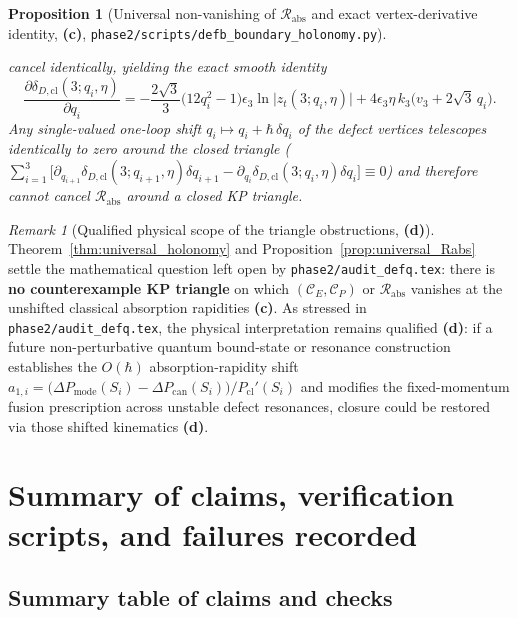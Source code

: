 \documentclass[11pt,a4paper]{article}
\newtheorem{proposition}[theorem]{Proposition}
\theoremstyle{remark}
\newtheorem{remark}[theorem]{Remark}
\newcommand{\hb}{\hbar}
\newcommand{\Lc}{\textbf{(c)}}
\newcommand{\Ld}{\textbf{(d)}}
\newcommand{\shol}{\texttt{phase2/\allowbreak scripts/\allowbreak defb\_\allowbreak boundary\_\allowbreak holonomy.py}}
\begin{document}
\begin{proposition}[Universal non-vanishing of $\mathcal{R}_{\mathrm{abs}}$ and exact vertex-derivative identity, \Lc, \shol]
\begin{enumerate}
cancel identically, yielding the exact smooth identity
\begin{equation}\label{eq:d_delta_dqi_exact}
  \boxed{\;
  \frac{\partial\delta_{D,\mathrm{cl}}(3;q_i,\eta)}{\partial q_i}
  = -\frac{2\sqrt{3}}{3}\big(12q_i^2 - 1\big)\epsilon_3\ln\big|z_t(3;q_i,\eta)\big|
    + 4\epsilon_3\eta\,k_3\big(v_3 + 2\sqrt{3}\,q_i\big).
  \;}
\end{equation}
Any single-valued one-loop shift $q_i \mapsto q_i + \hb\,\delta q_i$ of the
defect vertices telescopes identically to zero around the closed triangle
($\sum_{i=1}^3 \big[\partial_{q_{i+1}}\delta_{D,\mathrm{cl}}(3;q_{i+1},\eta)\delta q_{i+1} - \partial_{q_i}\delta_{D,\mathrm{cl}}(3;q_i,\eta)\delta q_i\big] \equiv 0$)
and therefore cannot cancel $\mathcal{R}_{\mathrm{abs}}$ around a closed KP
triangle.
\end{enumerate}
\end{proposition}

\begin{remark}[Qualified physical scope of the triangle obstructions, \Ld]\label{rem:qualified_scope}
Theorem~\ref{thm:universal_holonomy} and Proposition~\ref{prop:universal_Rabs}
settle the mathematical question left open by \texttt{phase2/audit\_defq.tex}:
there is \textbf{no counterexample KP triangle} on which $(\mathcal{C}_E,\mathcal{C}_P)$
or $\mathcal{R}_{\mathrm{abs}}$ vanishes at the unshifted classical absorption
rapidities \Lc. As stressed in \texttt{phase2/audit\_defq.tex}, the physical
interpretation remains qualified \Ld: if a future non-perturbative quantum
bound-state or resonance construction establishes the $O(\hb)$ absorption-rapidity
shift $a_{1,i} = \big(\Delta P_{\mathrm{mode}}(S_i) - \Delta P_{\mathrm{can}}(S_i)\big)/P_{\mathrm{cl}}'(S_i)$
and modifies the fixed-momentum fusion prescription across unstable defect
resonances, closure could be restored via those shifted kinematics \Ld.
\end{remark}

\section{Summary of claims, verification scripts, and failures recorded}
\label{sec:summary_failures}

\subsection{Summary table of claims and checks}
\end{document}
